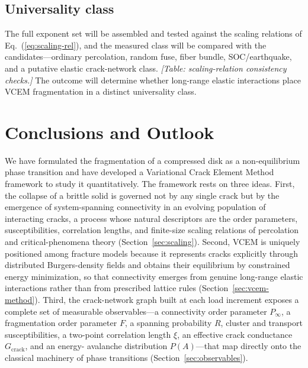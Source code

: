 \documentclass[preprint,12pt]{elsarticle}
\begin{document}
\subsection{Universality class}
\label{sec:res-universality}

The full exponent set will be assembled and tested against the scaling relations of
Eq.~(\ref{eq:scaling-rel}), and the measured class will be compared with the
candidates---ordinary percolation, random fuse, fiber bundle, SOC/earthquake, and a
putative elastic crack-network class. \emph{[Table: scaling-relation consistency
checks.]} The outcome will determine whether long-range elastic interactions place
VCEM fragmentation in a distinct universality class.

\section{Conclusions and Outlook}
\label{sec:conclusions}

We have formulated the fragmentation of a compressed disk as a non-equilibrium phase
transition and have developed a Variational Crack Element Method framework to study it
quantitatively. The framework rests on three ideas. First, the collapse of a brittle
solid is governed not by any single crack but by the emergence of system-spanning
connectivity in an evolving population of interacting cracks, a process whose natural
descriptors are the order parameters, susceptibilities, correlation lengths, and
finite-size scaling relations of percolation and critical-phenomena theory
(Section~\ref{sec:scaling}). Second, VCEM is uniquely positioned among fracture models
because it represents cracks explicitly through distributed Burgers-density fields and
obtains their equilibrium by constrained energy minimization, so that connectivity
emerges from genuine long-range elastic interactions rather than from prescribed
lattice rules (Section~\ref{sec:vcem-method}). Third, the crack-network graph built at
each load increment exposes a complete set of measurable observables---a connectivity
order parameter $P_\infty$, a fragmentation order parameter $F$, a spanning
probability $R$, cluster and transport susceptibilities, a two-point correlation
length $\xi$, an effective crack conductance $G_{\mathrm{crack}}$, and an energy-
avalanche distribution $P(A)$---that map directly onto the classical machinery of
phase transitions (Section~\ref{sec:observables}).
\end{document}
